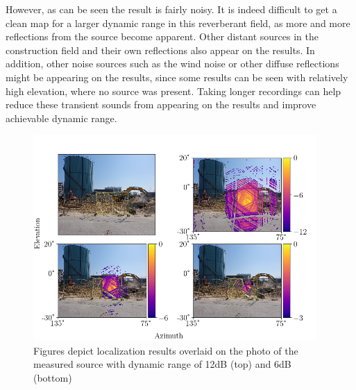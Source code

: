 However, as can be seen the result is fairly noisy. It is indeed difficult to get a clean map for a larger dynamic range in this reverberant field, as more and more reflections from the source become apparent. Other distant sources in the construction field and their own reflections also appear on the results. In addition, other noise sources such as the wind noise or other diffuse reflections might be appearing on the results, since some results can be seen with relatively high elevation, where no source was present. Taking longer recordings can help reduce these transient sounds from appearing on the results and improve achievable dynamic range.
\begin{figure}[!ht]
    \centering
    \includegraphics[width=0.96\textwidth]{Figures/const2image.png}
\caption{Figures depict localization results overlaid on the photo of the measured source with dynamic range of 12dB (top) and 6dB (bottom)}
\label{Fig:overlayimageoutside2}
\end{figure}
